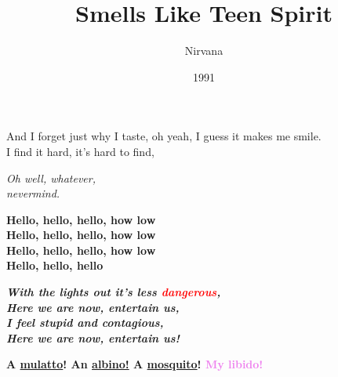\documentclass[letterpaper]{article}
\title{Smells Like Teen Spirit}
\author{Nirvana}
\date{1991}
\begin{document}
\maketitle
And I forget just why I taste, oh yeah, I guess it makes me smile.\\
I find it hard, it’s hard to find,
\begin{FlushRight}
	\emph{Oh well, whatever,}\\
	\emph{nevermind.}
\end{FlushRight}
\vspace{3em}
\textbf{Hello, hello, hello, how low\\
Hello, hello, hello, how low\\
Hello, hello, hello, how low\\
Hello, hello, hello}

\vspace{3em}

\textbf{\emph{With the lights out it’s less \textcolor{red}{dangerous},\\
Here we are now, entertain us,\\
\textcolor{wasteOfTime1}{I feel stupid and contagious,}\\
Here we are now, entertain us!}}
\vspace{2em}

\null\hspace{8em}\textbf{A \textcolor{wasteOfTime2}{\underline{mulatto}}! An \textcolor{black!30}{\underline{albino!}} A \underline{mosquito}! \textcolor{violet}{My libido!}}

\vspace{3em}
\end{document}
